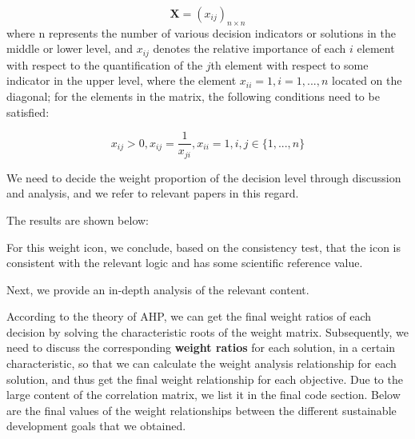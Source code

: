 \begin{equation}
\mathbf{X} =(x_{ij})_{n \times n} 
\end{equation}
where n represents the number of various decision indicators or solutions in the middle or lower level, and $x_{ij}$ denotes the relative importance of each $i$ element with respect to the quantification of the $j$th element with respect to some indicator in the upper level, where the element $x_{ii}=1,i=1,...,n$ located on the diagonal; for the elements in the matrix, the following conditions need to be satisfied:



     $$x_{ij}>0,
     x_{ij}  = \frac{1}{x_{ji}},
     x_{ii} = 1,
     i,j\in\{1,...,n\}$$





We need to decide the weight proportion of the decision level through discussion and analysis, and we refer to relevant papers in this regard.


The results are shown below:
\begin{center}
\end{center}

For this weight icon, we conclude, based on the consistency test, that the icon is consistent with the relevant logic and has some scientific reference value.

Next, we provide an in-depth analysis of the relevant content.

According to the theory of AHP, we can get the final weight ratios of each decision by solving the characteristic roots of the weight matrix. Subsequently, we need to discuss the corresponding \textbf{weight ratios} for each solution, in a certain characteristic, so that we can calculate the weight analysis relationship for each solution, and thus get the final weight relationship for each objective. Due to the large content of the correlation matrix, we list it in the final code section. Below are the final values of the weight relationships between the different sustainable development goals that we obtained.

